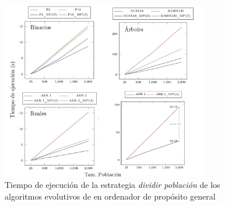 \begin{figure}[!h]
	\centering
	\includegraphics[width=0.80\textwidth]{images/chapter_4/pev_1_1mpi}
	\caption{Tiempo de ejecución de la estrategia \textit{dividir población} de los algoritmos evolutivos de en ordenador de propósito general}
	\label{fig:pev_mpi1_1}			
\end{figure}
\newpage

